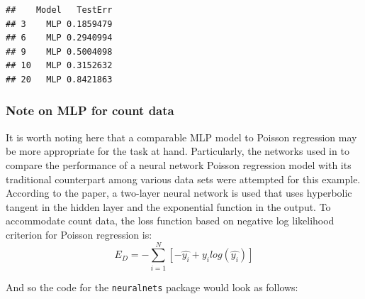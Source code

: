 \documentclass[
]{article}
\newenvironment{Shaded}{\begin{snugshade}}{\end{snugshade}}
\newcommand{\AttributeTok}[1]{\textcolor[rgb]{0.77,0.63,0.00}{#1}}
\newcommand{\CommentTok}[1]{\textcolor[rgb]{0.56,0.35,0.01}{\textit{#1}}}
\newcommand{\DecValTok}[1]{\textcolor[rgb]{0.00,0.00,0.81}{#1}}
\newcommand{\FunctionTok}[1]{\textcolor[rgb]{0.00,0.00,0.00}{#1}}
\newcommand{\NormalTok}[1]{#1}
\newcommand{\OtherTok}[1]{\textcolor[rgb]{0.56,0.35,0.01}{#1}}
\newcommand{\SpecialCharTok}[1]{\textcolor[rgb]{0.00,0.00,0.00}{#1}}
\newcommand{\StringTok}[1]{\textcolor[rgb]{0.31,0.60,0.02}{#1}}
\begin{document}
\begin{Shaded}
\end{Shaded}

\begin{verbatim}
##    Model   TestErr
## 3    MLP 0.1859479
## 6    MLP 0.2940994
## 9    MLP 0.5004098
## 10   MLP 0.3152632
## 20   MLP 0.8421863
\end{verbatim}

\hypertarget{note-on-mlp-for-count-data}{%
\subsubsection{Note on MLP for count
data}\label{note-on-mlp-for-count-data}}

It is worth noting here that a comparable MLP model to Poisson
regression may be more appropriate for the task at hand. Particularly,
the networks used in \cite{fallah2009nonlinear} to compare the
performance of a neural network Poisson regression model with its
traditional counterpart among various data sets were attempted for this
example. According to the paper, a two-layer neural network is used that
uses hyperbolic tangent in the hidden layer and the exponential function
in the output. To accommodate count data, the loss function based on
negative log likelihood criterion for Poisson regression is: \[
E_D = - \sum_{i=1}^N \left[ -\hat{y_i} + y_i log(\hat{y_i}) \right]
\]

And so the code for the \texttt{neuralnets} package would look as
follows:
\end{document}

